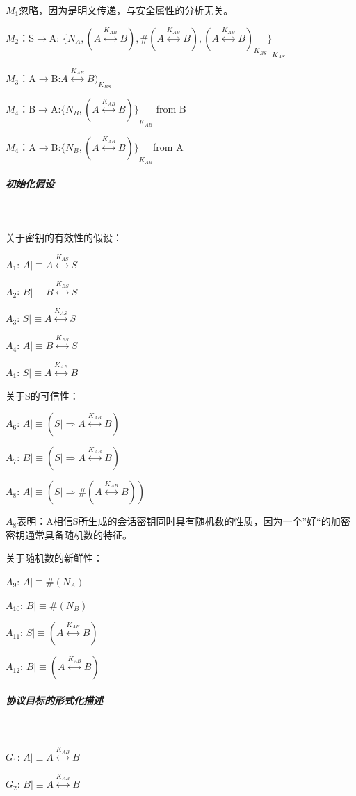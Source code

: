 \documentclass[cs4size,a4pape,UTF8]{ctexart}
\numberwithin{equation}{section}
\numberwithin{table}{section}
\numberwithin{figure}{section}
\begin{document}
$M_{1}$忽略，因为是明文传递，与安全属性的分析无关。

$M_{2}$：S$\to$A: ${\{N_{A},(A\stackrel{K_{AB}}{\longleftrightarrow}B),\#(A\stackrel{K_{AB}}{\longleftrightarrow}B),{(A\stackrel{K_{AB}}{\longleftrightarrow}B)}_{K_{BS}}\}}_{K_{AS}}$

$M_{3}$：A$\to$B:$ {A\stackrel{K_{AB}}{\longleftrightarrow}B)}_{K_{BS}}$ 

$M_{4}$：B$\to$A:${\{N_{B},(A\stackrel{K_{AB}}{\longleftrightarrow}B)\}}_{K_{AB}}$ from B

$M_{4}$：A$\to$B:${\{N_{B},(A\stackrel{K_{AB}}{\longleftrightarrow}B)\}}_{K_{AB}}$from A

\subparagraph{初始化假设}\

关于密钥的有效性的假设：

$A_{1}$: $A{\lvert\equiv}A\stackrel{K_{AS}}{\longleftrightarrow}S$

$A_{2}$: $B{\lvert\equiv}B\stackrel{K_{BS}}{\longleftrightarrow}S$

$A_{3}$: $S{\lvert\equiv}A\stackrel{K_{AS}}{\longleftrightarrow}S$

$A_{4}$: $A{\lvert\equiv}B\stackrel{K_{BS}}{\longleftrightarrow}S$

$A_{1}$: $S{\lvert\equiv}A\stackrel{K_{AB}}{\longleftrightarrow}B$

关于S的可信性：

$A_{6}$: $A{\lvert\equiv}(S{\lvert\Rightarrow}A\stackrel{K_{AB}}{\longleftrightarrow}B)$

$A_{7}$: $B{\lvert\equiv}(S{\lvert\Rightarrow}A\stackrel{K_{AB}}{\longleftrightarrow}B)$

$A_{8}$: $A{\lvert\equiv}(S{\lvert\Rightarrow}\#(A\stackrel{K_{AB}}{\longleftrightarrow}B))$

$A_{8}$表明：A相信S所生成的会话密钥同时具有随机数的性质，因为一个”好“的加密密钥通常具备随机数的特征。

关于随机数的新鲜性：

$A_{9}$: $A{\lvert\equiv}\#(N_{A})$

$A_{10}$: $B{\lvert\equiv}\#(N_{B})$

$A_{11}$: $S{\lvert\equiv}(A\stackrel{K_{AB}}{\longleftrightarrow}B)$

$A_{12}$: $B{\lvert\equiv}(A\stackrel{K_{AB}}{\longleftrightarrow}B)$

\subparagraph{协议目标的形式化描述}\

$G_{1}$: $A{\lvert\equiv}A\stackrel{K_{AB}}{\longleftrightarrow}B$

$G_{2}$: $B{\lvert\equiv}A\stackrel{K_{AB}}{\longleftrightarrow}B$
\end{document}
